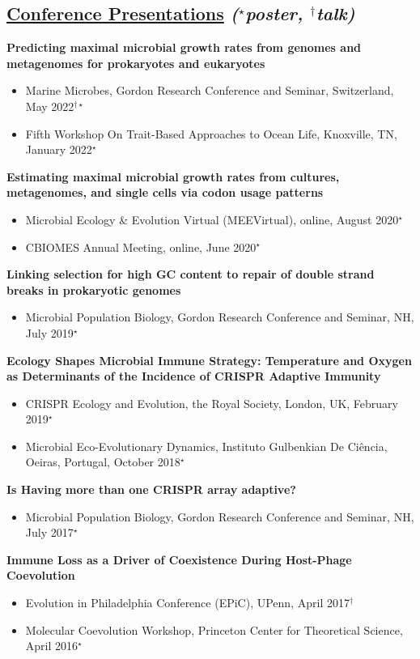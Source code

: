 \documentclass[]{res}
\begin{document}
\begin{resume}
 \section{\underline{Conference Presentations} \emph{{($^{\star}$poster, $^{\dagger}$talk)}}} \vspace{2mm}
 
 {\bf Predicting maximal microbial growth rates from genomes and metagenomes for prokaryotes and eukaryotes}
 \begin{itemize}
 \item Marine Microbes, Gordon Research Conference and Seminar, Switzerland, May 2022$^{\dagger\star}$
 \item Fifth Workshop On Trait-Based Approaches to Ocean Life, Knoxville, TN, January 2022$^{\star}$
 \end{itemize} 
 
 {\bf Estimating maximal microbial growth rates from cultures, metagenomes, and single cells via codon usage patterns}
 \begin{itemize}
 \item Microbial Ecology \& Evolution Virtual (MEEVirtual), online, August 2020$^{\star}$
 \item CBIOMES Annual Meeting, online, June 2020$^{\star}$
 \end{itemize}
 
{\bf Linking selection for high GC content to repair of double strand breaks in prokaryotic genomes}
 \begin{itemize}
 \item Microbial Population Biology, Gordon Research Conference and Seminar, NH, July 2019$^{\star}$
 \end{itemize} 
 
{\bf Ecology Shapes Microbial Immune Strategy: Temperature and Oxygen as Determinants of the Incidence of CRISPR Adaptive Immunity} 
 \begin{itemize}
 \item CRISPR Ecology and Evolution, the Royal Society, London, UK, February 2019$^{\star}$
 \item Microbial Eco-Evolutionary Dynamics, Instituto Gulbenkian De Ci\^{e}ncia, Oeiras, Portugal, October 2018$^{\star}$
 \end{itemize}
 
 {\bf Is Having more than one CRISPR array adaptive?}
 \begin{itemize}
 \item Microbial Population Biology, Gordon Research Conference and Seminar, NH, July 2017$^{\star}$
 \end{itemize}
 
  {\bf Immune Loss as a Driver of Coexistence During Host-Phage Coevolution}
 \begin{itemize}
 \item Evolution in Philadelphia Conference (EPiC), UPenn, April 2017$^{\dagger}$
 \item Molecular Coevolution Workshop, Princeton Center for Theoretical Science, April 2016$^{\star}$
 \end{itemize}


\end{resume} 
\end{document}
